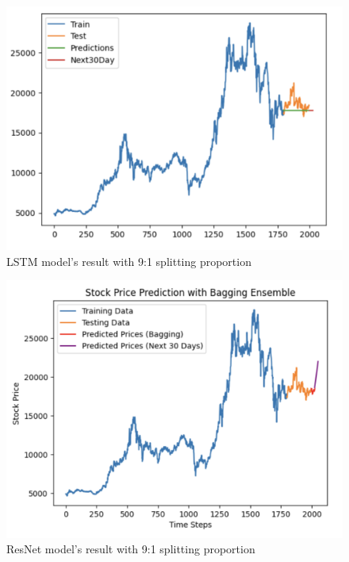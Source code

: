 \documentclass{ieeeojies}
\begin{document}
\begin{figure}[H]
  \centering
  \begin{minipage}{0.8\linewidth}
    \centering
    \includegraphics[width=\linewidth]{bibliography/ETS_MBB91.png}
    \caption{LSTM model's result with 9:1 splitting proportion}
    \label{fig21}
  \end{minipage}
\end{figure}
\begin{figure}[H]
  \centering
  \begin{minipage}{0.8\linewidth}
    \centering
    \includegraphics[width=\linewidth]{bibliography/baggingGRU_MBB.png}
    \caption{ResNet model's result with 9:1 splitting proportion}
    \label{mbbbggg}
  \end{minipage}
\end{figure}
\end{document}
